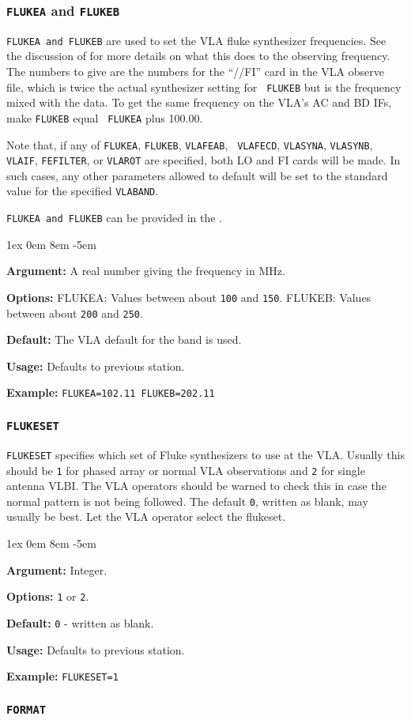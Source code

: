 \documentclass{report}
\newcommand{\rcwbox}[5]{
  \begin{list}{}{\parsep 1ex  \itemsep 0em
                 \leftmargin 8em  \itemindent -5em }
    \item {\bf Argument:} #1
    \item {\bf Options:}  #2
    \item {\bf Default:}  #3
    \item {\bf Usage:}    #4
    \item {\bf Example:}  #5
  \end{list}
}
\begin{document}
\subsubsection{\label{SP:FLUKEA}{\tt FLUKEA} and {\tt FLUKEB}}

{\tt FLUKEA and FLUKEB} are used to set the VLA fluke synthesizer
frequencies.  See the discussion of 
for more details on what this does to the observing frequency.  The
numbers to give are the numbers for the ``//FI'' card in the VLA
observe file, which is twice the actual synthesizer setting for {\tt
FLUKEB} but is the frequency mixed with the data.  To get the same
frequency on the VLA's AC and BD IFs, make {\tt FLUKEB} equal {\tt
FLUKEA} plus 100.00.

Note that, if any of {\tt FLUKEA}, {\tt FLUKEB}, {\tt VLAFEAB}, {\tt
VLAFECD}, {\tt VLASYNA}, {\tt VLASYNB}, {\tt VLAIF}, {\tt FEFILTER},
or {\tt VLAROT} are specified, both LO and FI cards will be made.  In
such cases, any other parameters allowed to default will be set to the
standard value for the specified {\tt VLABAND}.

{\tt FLUKEA and FLUKEB} can be provided in the .

\rcwbox
{A real number giving the frequency in MHz.}
{FLUKEA: Values between about {\tt 100} and {\tt 150}.
FLUKEB: Values between about {\tt 200} and {\tt 250}.}
{The VLA default for the band is used.}
{Defaults to previous station.}
{{\tt FLUKEA=102.11  FLUKEB=202.11}}


\subsubsection{\label{SP:FLUKESET}{\tt FLUKESET}}


{\tt FLUKESET} specifies which set of Fluke synthesizers to use at the
VLA.  Usually this should be {\tt 1} for phased array or normal VLA
observations and {\tt 2} for single antenna VLBI. The VLA operators
should be warned to check this in case the normal pattern is not being
followed. The default {\tt 0}, written as blank, may usually be
best. Let the VLA operator select the flukeset.

\rcwbox
{Integer.}
{{\tt 1} or {\tt 2}.}
{{\tt 0} - written as blank.}
{Defaults to previous station.}
{{\tt FLUKESET=1}}


\subsubsection{\label{SP:FORMAT}{\tt FORMAT}}
\end{document}
